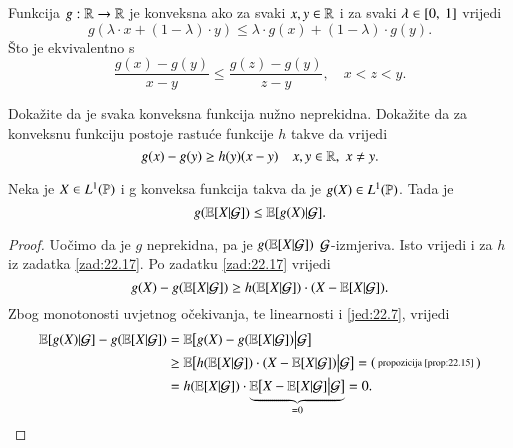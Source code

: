 Funkcija $g : \mathbb{R} \to \mathbb{R}$ je konveksna ako za svaki $x, y \in \mathbb{R}$ i za svaki $\lambda \in [{0}, \:{1}]$ vrijedi
\begin{equation*}
    g (\lambda \cdot x + (1 - \lambda) \cdot y) \leq \lambda \cdot g (x) + (1 - \lambda) \cdot g (y).
\end{equation*}
\v Sto je ekvivalentno s
\begin{equation*}
    \frac{g(x) - g(y)}{x - y} \leq \frac{g(z) - g(y)}{z - y}, \quad x < z < y.
\end{equation*}

\begin{zad} \label{zad:22.17}
    Doka\v zite da je svaka konveksna funkcija nu\v zno neprekidna.
    Doka\v zite da za konveksnu funkciju postoje rastu\' ce funkcije $h$ takve da vrijedi
    \begin{equation*}
        g(x) - g(y) \geq h(y) (x - y) \quad x, y \in \mathbb{R}, \; x \neq y.
    \end{equation*}
\end{zad}

\begin{prop}    \label{zad:22.18}
    Neka je $X \in L^1 (\mathbb{P})$ i g konveksa funkcija takva da je $g(X) \in L^1 (\mathbb{P})$.
    Tada je
    \begin{equation*}
        g (\mathbb{E} [X | \mathcal{G}]) \leq \mathbb{E} [g(X) | \mathcal{G}].
    \end{equation*}
\end{prop}

\begin{proof}
    Uo\v cimo da je $g$ neprekidna, pa je $g(\mathbb{E}[X | \mathcal{G}])$ $\mathcal{G}$-izmjeriva.
    Isto vrijedi i za $h$ iz zadatka \ref{zad:22.17}.
    Po zadatku \ref{zad:22.17} vrijedi
    \begin{equation*}
        g(X) - g(\mathbb{E}[X | \mathcal{G}]) \geq h (\mathbb{E} [X | \mathcal{G}]) \cdot (X - \mathbb{E} [X | \mathcal{G}]).
    \end{equation*}
    Zbog monotonosti uvjetnog o\v cekivanja, te linearnosti i \eqref{jed:22.7}, vrijedi
    \begin{equation*}
        \begin{aligned}
            \mathbb{E} [g(X) | \mathcal{G}] - g(\mathbb{E} [X | \mathcal{G}]) &= \mathbb{E} \big[g(X) - g(\mathbb{E} [X | \mathcal{G}]) \big| \mathcal{G} \big]\\
            &\geq \mathbb{E} \big[h (\mathbb{E} [X | \mathcal{G}]) \cdot (X - \mathbb{E} [X | \mathcal{G}]) \big| \mathcal{G} \big] =
            \begin{psmallmatrix}
                \textnormal{propozicija \ref{prop:22.15}}
            \end{psmallmatrix}\\
            &= h (\mathbb{E} [X | \mathcal{G}]) \cdot \underbrace{\mathbb{E} \big[X - \mathbb{E} [X | \mathcal{G}] \big| \mathcal{G} \big]}_{= 0} = 0.
        \end{aligned}
    \end{equation*} 
\end{proof}

